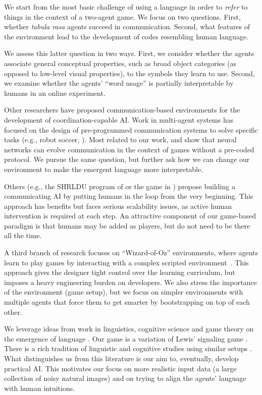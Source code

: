 We start  from the most basic challenge of using a language
in order to \emph{refer} to things in the context of a two-agent game.
We focus on two questions. First, whether \emph{tabula rasa} agents
succeed in communication. Second, what features of the environment 
lead to the development of codes resembling human
language. 

We assess this latter question in two ways. 
First, we consider whether the agents associate general
conceptual properties, such as broad object categories (as opposed to 
low-level visual properties), to the symbols they learn to use. Second, we 
examine whether the agents' ``word usage'' is partially interpretable by 
humans in an online experiment.

Other researchers have proposed communication-based environments for
the development of coordination-capable AI. 
Work in multi-agent systems has focused on the design of
pre-programmed communication systems to solve specific tasks (e.g.,
robot soccer, \citealt{stone1998towards}).  Most related to our work, \cite{sukhbaatar2016learning} and \cite{Foerster:etal:2016}
show that neural networks can evolve communication
in the context of games without a pre-coded protocol.
We pursue the same question, but further ask how we
can change our environment to make the emergent language more interpretable.

Others (e.g., the SHRLDU program of \citealt{Winograd:1971} or the game in \citealt{Wang:etal:2016}) propose building a communicating AI by putting humans in the loop from the very beginning. This approach has benefits but faces serious scalability issues, as active human intervention is required at each step. An attractive component of our game-based paradigm is that humans may be added as players, but do not need to be there all the time.

A third branch of research focuses on ``Wizard-of-Oz'' environments,
where agents learn to play games by interacting with a complex
scripted environment~\citep{Mikolov:etal:2015a}. This approach gives
the designer tight control over the learning curriculum, but imposes a
heavy engineering burden on developers. We also stress the
importance of the environment (game setup), but we focus on simpler environments with multiple agents that force them to get smarter by bootstrapping on top of each
other. 

We leverage ideas from work in linguistics, cognitive science and game
theory on the emergence of language 
\citep{Wagner:etal:2003,Skyrms:2010,
  crawford1982strategic,crawford:1998survey}. 
Our game is a variation
of Lewis' signaling game \citep{Lewis:1969}. There is a rich
tradition of linguistic and cognitive studies using similar setups
\citep[e.g.,][]{Briscoe:2002,Cangelosi:Parisi:2002,Spike:etal:2016,Steels:Loetzsch:2012}. What
distinguishes us from this literature is our aim to, eventually,
develop practical AI. This motivates our focus on more realistic input
data (a large collection of noisy natural images) and on trying to
align the agents' language with human intuitions.

